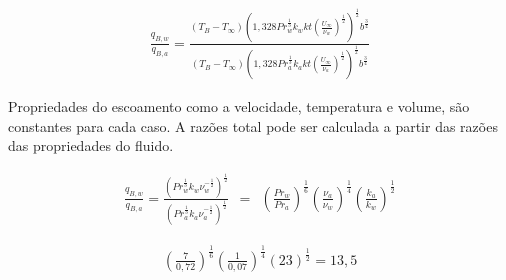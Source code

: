 \documentclass[12pt]{article}
\begin{document}
\begin{equation}
	\begin{aligned}
		\frac{q_{B,w}}{q_{B,a}} = \frac{(T_{B} - T_{\infty})\left(1,328Pr^{\frac{1}{3}}_{w}k_{w}kt\left(\frac{U_{\infty}}{\nu_{w}}\right)^{\frac{1}{2}}\right)^{\frac{1}{2}} b^{\frac{3}{4}} }{(T_{B} - T_{\infty})\left(1,328Pr^{\frac{1}{3}}_{a}k_{a}kt\left(\frac{U_{\infty}}{\nu_{a}}\right)^{\frac{1}{2}}\right)^{\frac{1}{2}} b^{\frac{3}{4}} }
	\end{aligned}
\end{equation}

Propriedades do escoamento como a velocidade, temperatura e volume, são constantes para cada caso. A razões total pode ser calculada a partir das razões das propriedades do fluido.

\begin{equation}
	\begin{aligned}
		\frac{q_{B,w}}{q_{B,a}} = \frac{\left(Pr^{\frac{1}{3}}_{w}k_{w} \nu^{-\frac{1}{2}}_{w}\right)^{\frac{1}{2}}  }{\left(Pr^{\frac{1}{3}}_{a}k_{a}\nu^{-\frac{1}{2}}_{a}\right)^{\frac{1}{2}}  }\ \ = \ \ \left( \frac{Pr_{w}}{Pr_{a}}\right)^{\frac{1}{6}} \left( \frac{\nu_{a}}{\nu_{w}}\right)^{\frac{1}{4}} \left( \frac{k_{a}}{k_{w}}\right)^{\frac{1}{2}}
	\end{aligned}
\end{equation}

\begin{equation}
	\begin{aligned}
		 \left( \frac{7}{0,72}\right)^{\frac{1}{6}} \left( {\frac{1}{0,07}}\right)^{\frac{1}{4}} \left( 23\right)^{\frac{1}{2}} = 13,5
	\end{aligned}
\end{equation}
\end{document}
